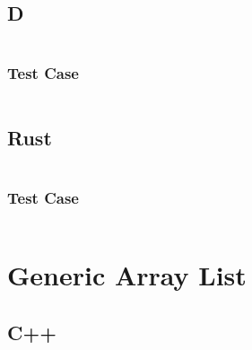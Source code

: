 \documentclass[finalcopy]{srpaper}
\begin{document}
\begin{mdframed}[linecolor=black]
\inputminted[fontsize=\scriptsize]{cpp}{../examples/int-linked-list/int_linked_list.cpp}
\end{mdframed}

\subsection{D}
\begin{mdframed}[linecolor=black]
\inputminted[fontsize=\scriptsize]{d}{../examples/int-linked-list/int_linked_list.d}
\end{mdframed}

\subsubsection{Test Case}
\begin{mdframed}[linecolor=black]
\inputminted[fontsize=\scriptsize]{d}{../examples/int-linked-list/tests/int-linked-list-test.d}
\end{mdframed}

\subsection{Rust}
\begin{mdframed}[linecolor=black]
\inputminted[fontsize=\scriptsize]{rust}{../examples/int-linked-list/int_linked_list.rs}
\end{mdframed}

\subsubsection{Test Case}
\begin{mdframed}[linecolor=black]
\inputminted[fontsize=\scriptsize]{rust}{../examples/int-linked-list/tests/int-linked-list-test.rs}
\end{mdframed}

\section{Generic Array List}
\subsection{C++}
\begin{mdframed}[linecolor=black]
\inputminted[fontsize=\scriptsize]{cpp}{../examples/generic-array-list/generic_array_list.hpp}
\end{mdframed}
\end{document}
